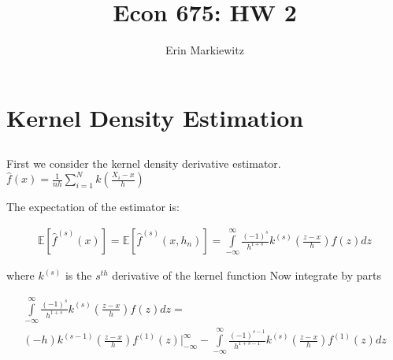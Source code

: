 \documentclass[12pt]{article}
\newcommand{\E}{\mathbb{E}}
\begin{document}





\title{Econ 675: HW 2}
\author{Erin Markiewitz}
\maketitle
\newpage
\tableofcontents


\section{Kernel Density Estimation}
\subsection{}


First we consider the kernel density derivative estimator. $\hat{f}(x) =  \frac{1}{nh} \sum\limits_{i=1}^N k \left( \frac{X_i-x}{h} \right)$

The expectation of the estimator is:


\begin{gather*}
  \E[\hat{f}^{(s)}(x)] = \E[\hat{f}^{(s)}(x,h_n)] = \int\limits_{-\infty}^{\infty} \frac{(-1)^{s}}{h^{1+s}} k^{(s)} \left( \frac{z-x}{h} \right) f(z) dz
\end{gather*}


where $k^{(s)}$ is the $s^{th}$ derivative of the kernel function
Now integrate by parts

\begin{gather*}
\int\limits_{-\infty}^{\infty} \frac{(-1)^{s}}{h^{1+s}} k^{(s)} \left( \frac{z-x}{h} \right) f(z) dz =\\
 (-h)k^{(s-1)} \left( \frac{z-x}{h} \right)  f^{(1)}(z) |^\infty_{-\infty} - \int\limits_{-\infty}^{\infty}  \frac{(-1)^{s-1}}{h^{1+s-1}} k^{(s)} \left( \frac{z-x}{h} \right) f^{(1)}(z) dz
\end{gather*}
\end{document}
